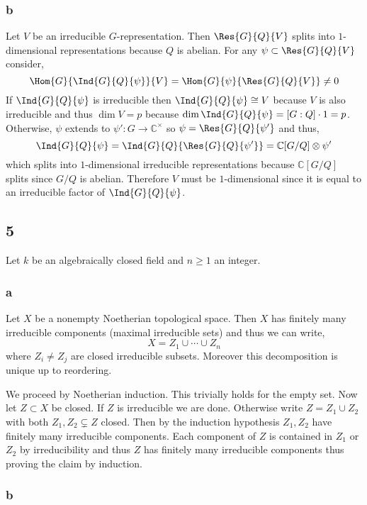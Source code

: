 \documentclass[12pt]{article}
\renewcommand{\C}{\mathbb{C}}
\begin{document}
\subsubsection{b}

Let $V$ be an irreducible $G$-representation. Then $\Res{G}{Q}{V}$ splits into $1$-dimensional representations because $Q$ is abelian. For any $\psi \subset \Res{G}{Q}{V}$ consider,
\[ \Hom{G}{\Ind{G}{Q}{\psi}}{V} = \Hom{G}{\psi}{\Res{G}{Q}{V}} \neq 0 \]
If $\Ind{G}{Q}{\psi}$ is irreducible then $\Ind{G}{Q}{\psi} \cong V$ because $V$ is also irreducible and thus $\dim{V} = p$ because $\dim{\Ind{G}{Q}{\psi}} = [G : Q] \cdot 1 = p$. Otherwise, $\psi$ extends to $\psi' : G \to \C^\times$ so $\psi = \Res{G}{Q}{\psi'}$ and thus,
\[ \Ind{G}{Q}{\psi} = \Ind{G}{Q}{\Res{G}{Q}{\psi'}} = \C[G/Q] \otimes \psi' \]
which splits into $1$-dimensional irreducible representations because $\C[G/Q]$ splits since $G/Q$ is abelian. Therefore $V$ must be $1$-dimensional since it is equal to an irreducible factor of $\Ind{G}{Q}{\psi}$. 

\subsection{5}

Let $k$ be an algebraically closed field and $n \ge 1$ an integer.

\subsubsection{a}

\begin{prop}
Let $X$ be a nonempty Noetherian topological space. Then $X$ has finitely many irreducible components (maximal irreducible sets) and thus we can write,
\[ X = Z_1 \cup \cdots \cup Z_n \]
where $Z_i \neq Z_j$ are closed irreducible subsets. Moreover this decomposition is unique up to reordering.
\end{prop}

We proceed by Noetherian induction. This trivially holds for the empty set. Now let $Z \subset X$ be closed. If $Z$ is irreducible we are done. Otherwise write $Z = Z_1 \cup Z_2$ with both $Z_1, Z_2 \subsetneq Z$ closed. Then by the induction hypothesis $Z_1, Z_2$ have finitely many irreducible components. Each component of $Z$ is contained in $Z_1$ or $Z_2$ by irreducibility and thus $Z$ has finitely many irreducible components thus proving the claim by induction.

\subsubsection{b}
\end{document}
